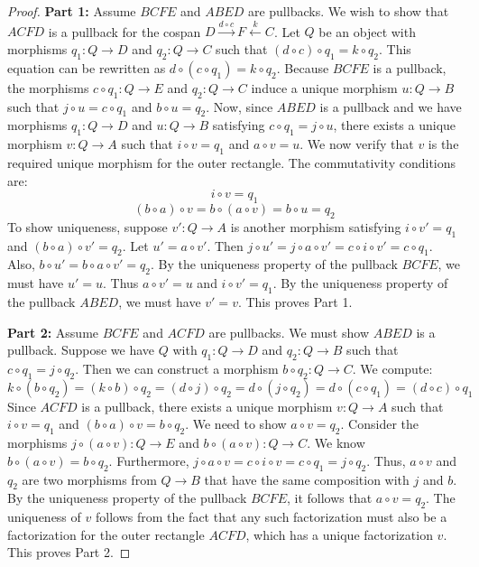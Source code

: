 \begin{proof}
\textbf{Part 1:} Assume $BCFE$ and $ABED$ are pullbacks. We wish to show that $ACFD$ is a pullback for the cospan $D \xrightarrow{d \circ c} F \xleftarrow{k} C$.
Let $Q$ be an object with morphisms $q_1: Q \to D$ and $q_2: Q \to C$ such that $(d \circ c) \circ q_1 = k \circ q_2$.
This equation can be rewritten as $d \circ (c \circ q_1) = k \circ q_2$. 
Because $BCFE$ is a pullback, the morphisms $c \circ q_1: Q \to E$ and $q_2: Q \to C$ induce a unique morphism $u: Q \to B$ such that $j \circ u = c \circ q_1$ and $b \circ u = q_2$.
Now, since $ABED$ is a pullback and we have morphisms $q_1: Q \to D$ and $u: Q \to B$ satisfying $c \circ q_1 = j \circ u$, there exists a unique morphism $v: Q \to A$ such that $i \circ v = q_1$ and $a \circ v = u$.
We now verify that $v$ is the required unique morphism for the outer rectangle.
The commutativity conditions are:
\[
i \circ v = q_1
\]
\[
(b \circ a) \circ v = b \circ (a \circ v) = b \circ u = q_2
\]
To show uniqueness, suppose $v': Q \to A$ is another morphism satisfying $i \circ v' = q_1$ and $(b \circ a) \circ v' = q_2$.
Let $u' = a \circ v'$. Then $j \circ u' = j \circ a \circ v' = c \circ i \circ v' = c \circ q_1$.
Also, $b \circ u' = b \circ a \circ v' = q_2$.
By the uniqueness property of the pullback $BCFE$, we must have $u' = u$.
Thus $a \circ v' = u$ and $i \circ v' = q_1$. By the uniqueness property of the pullback $ABED$, we must have $v' = v$. This proves Part 1.

\textbf{Part 2:} Assume $BCFE$ and $ACFD$ are pullbacks. We must show $ABED$ is a pullback.
Suppose we have $Q$ with $q_1: Q \to D$ and $q_2: Q \to B$ such that $c \circ q_1 = j \circ q_2$.
Then we can construct a morphism $b \circ q_2: Q \to C$. We compute:
\[
k \circ (b \circ q_2) = (k \circ b) \circ q_2 = (d \circ j) \circ q_2 = d \circ (j \circ q_2) = d \circ (c \circ q_1) = (d \circ c) \circ q_1
\]
Since $ACFD$ is a pullback, there exists a unique morphism $v: Q \to A$ such that $i \circ v = q_1$ and $(b \circ a) \circ v = b \circ q_2$.
We need to show $a \circ v = q_2$.
Consider the morphisms $j \circ (a \circ v): Q \to E$ and $b \circ (a \circ v): Q \to C$.
We know $b \circ (a \circ v) = b \circ q_2$.
Furthermore, $j \circ a \circ v = c \circ i \circ v = c \circ q_1 = j \circ q_2$.
Thus, $a \circ v$ and $q_2$ are two morphisms from $Q \to B$ that have the same composition with $j$ and $b$. By the uniqueness property of the pullback $BCFE$, it follows that $a \circ v = q_2$.
The uniqueness of $v$ follows from the fact that any such factorization must also be a factorization for the outer rectangle $ACFD$, which has a unique factorization $v$. This proves Part 2.
\end{proof}

